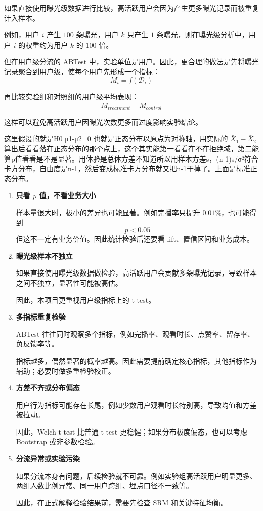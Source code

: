  \begin{example}[曝光级重复放大问题]
如果直接使用曝光级数据进行比较，高活跃用户会因为产生更多曝光记录而被重复计入样本。

例如，用户 $i$ 产生 $100$ 条曝光，用户 $k$ 只产生 $1$ 条曝光，则在曝光级分析中，用户 $i$ 的权重约为用户 $k$ 的 $100$ 倍。

但在用户级分流的 ABTest 中，实验单位是用户。因此，更合理的做法是先将曝光记录聚合到用户级，使每个用户先形成一个指标：
\[
M_i = f(\mathcal{D}_i)
\]

再比较实验组和对照组的用户级平均表现：
\[
\bar{M}_{treatment} - \bar{M}_{control}
\]

这样可以避免高活跃用户因曝光次数更多而过度影响实验结论。
\end{example}
\begin{dxtips}
    这里假设的就是H0 μ1-μ2=0
    也就是正态分布以原点为对称轴，用实际的 $
    \bar X_1-\bar X_2
    $算出后看看落在正态分布的那个点上，这个其实能第一看看在不在拒绝域，第二能算p值看看是不是显著。用体验是总体方差不知道所以用样本方差s，(n-1)s/σ²符合卡方分布，自由度是n-1，然后变成标准卡方分布就又把n-1干掉了。上面是标准正态分布。
\end{dxtips}
\begin{enumerate}
    \item \textbf{只看 $p$ 值，不看业务大小}

    样本量很大时，极小的差异也可能显著。例如完播率只提升 $0.01\%$，也可能得到
    \[
    p < 0.05
    \]
    但这不一定有业务价值。因此统计检验后还要看 lift、置信区间和业务成本。

    \item \textbf{曝光级样本不独立}

    如果直接使用曝光级数据做检验，高活跃用户会贡献多条曝光记录，导致样本之间不独立，显著性可能被高估。

    因此，本项目更重视用户级指标上的 t-test。

    \item \textbf{多指标重复检验}

    ABTest 往往同时观察多个指标，例如完播率、观看时长、点赞率、留存率、负反馈率等。

    指标越多，偶然显著的概率越高。因此需要提前确定核心指标，其他指标作为辅助；必要时做多重检验校正。

    \item \textbf{方差不齐或分布偏态}

    用户行为指标可能存在长尾，例如少数用户观看时长特别高，导致均值和方差被拉动。

    因此，Welch t-test 比普通 t-test 更稳健；如果分布极度偏态，也可以考虑 Bootstrap 或非参数检验。

    \item \textbf{分流异常或实验污染}

    如果分流本身有问题，后续检验就不可靠。例如实验组高活跃用户明显更多、两组人数比例异常、同一用户跨组、埋点口径不一致等。

    因此，在正式解释检验结果前，需要先检查 SRM 和关键特征均衡。
\end{enumerate}
